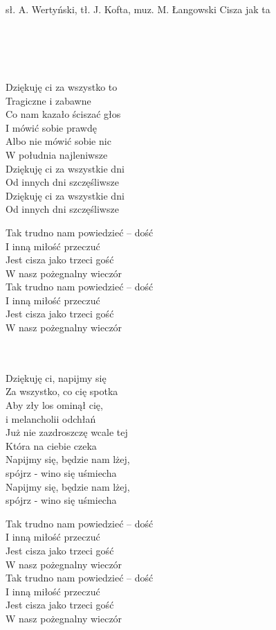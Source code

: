 {sł. A. Wertyński, tł. J. Kofta, muz. M. Łangowski}
{Cisza jak ta}
\begin{text}
~\\
~\\
~\\
~\\
Dziękuję ci za wszystko to \\
Tragiczne i zabawne \\
Co nam kazało ściszać głos \\
I mówić sobie prawdę \\
Albo nie mówić sobie nic \\
W południa najleniwsze \\
Dziękuję ci za wszystkie dni \\
Od innych dni szczęśliwsze \\
Dziękuję ci za wszystkie dni \\
Od innych dni szczęśliwsze

\vin Tak trudno nam powiedzieć – dość \\
\vin I inną miłość przeczuć \\
\vin Jest cisza jako trzeci gość \\
\vin W nasz pożegnalny wieczór \\
\vin Tak trudno nam powiedzieć – dość \\
\vin I inną miłość przeczuć \\
\vin Jest cisza jako trzeci gość \\
\vin W nasz pożegnalny wieczór\\
~\\
~

Dziękuję ci, napijmy się \\
Za wszystko, co cię spotka \\
Aby zły los ominął cię, \\
i melancholii odchłań \\
Już nie zazdroszczę wcale tej \\
Która na ciebie czeka \\
Napijmy się, będzie nam lżej, \\
spójrz - wino się uśmiecha \\
Napijmy się, będzie nam lżej, \\
spójrz - wino się uśmiecha

\vin Tak trudno nam powiedzieć – dość \\
\vin I inną miłość przeczuć \\
\vin Jest cisza jako trzeci gość \\
\vin W nasz pożegnalny wieczór \\
\vin Tak trudno nam powiedzieć – dość \\
\vin I inną miłość przeczuć \\
\vin Jest cisza jako trzeci gość \\
\vin W nasz pożegnalny wieczór\\
~\\
~\\
~\\
~


\end{text}
